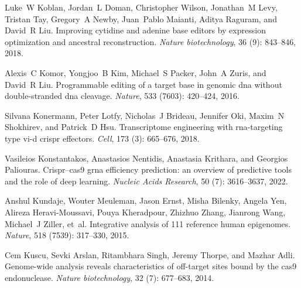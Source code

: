 \documentclass[pdftex,english,10pt]{article}
\begin{document}
{\begin{thebibliography}{105}
Luke~W Koblan, Jordan~L Doman, Christopher Wilson, Jonathan~M Levy, Tristan
  Tay, Gregory~A Newby, Juan~Pablo Maianti, Aditya Raguram, and David~R Liu.
\newblock Improving cytidine and adenine base editors by expression
  optimization and ancestral reconstruction.
\newblock \emph{Nature biotechnology}, 36 (9): 843--846,
  2018.

Alexis~C Komor, Yongjoo~B Kim, Michael~S Packer, John~A Zuris, and David~R Liu.
\newblock Programmable editing of a target base in genomic dna without
  double-stranded dna cleavage.
\newblock \emph{Nature}, 533 (7603): 420--424, 2016.

Silvana Konermann, Peter Lotfy, Nicholas~J Brideau, Jennifer Oki, Maxim~N
  Shokhirev, and Patrick~D Hsu.
\newblock Transcriptome engineering with rna-targeting type vi-d crispr
  effectors.
\newblock \emph{Cell}, 173 (3): 665--676, 2018.

Vasileios Konstantakos, Anastasios Nentidis, Anastasia Krithara, and Georgios
  Paliouras.
\newblock Crispr--cas9 grna efficiency prediction: an overview of predictive
  tools and the role of deep learning.
\newblock \emph{Nucleic Acids Research}, 50 (7): 3616--3637,
  2022.

Anshul Kundaje, Wouter Meuleman, Jason Ernst, Misha Bilenky, Angela Yen,
  Alireza Heravi-Moussavi, Pouya Kheradpour, Zhizhuo Zhang, Jianrong Wang,
  Michael~J Ziller, et~al.
\newblock Integrative analysis of 111 reference human epigenomes.
\newblock \emph{Nature}, 518 (7539): 317--330, 2015.

Cem Kuscu, Sevki Arslan, Ritambhara Singh, Jeremy Thorpe, and Mazhar Adli.
\newblock Genome-wide analysis reveals characteristics of off-target sites
  bound by the cas9 endonuclease.
\newblock \emph{Nature biotechnology}, 32 (7): 677--683,
  2014.


\end{thebibliography}}
\end{document}
